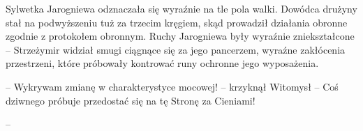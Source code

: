 \par\indent Sylwetka Jarogniewa odznaczała się wyraźnie na tle pola walki. Dowódca drużyny stał na podwyższeniu tuż za trzecim kręgiem, skąd prowadził działania obronne zgodnie z protokołem obronnym. Ruchy Jarogniewa były wyraźnie zniekształcone -- Strzeżymir widział smugi ciągnące się za jego pancerzem, wyraźne zakłócenia przestrzeni, które próbowały kontrować runy ochronne jego wyposażenia.
\par\noindent-- Wykrywam zmianę w charakterystyce mocowej! -- krzyknął Witomysł -- Coś dziwnego próbuje przedostać się na tę Stronę za Cieniami!
\par\noindent-- 


